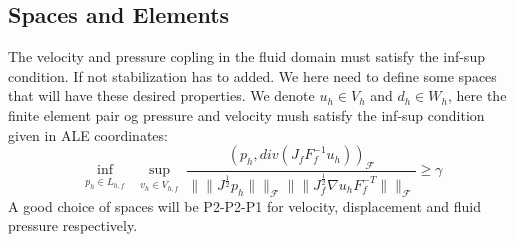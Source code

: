 \subsection*{Spaces and Elements}
The velocity and pressure copling in the fluid domain must satisfy the inf-sup condition. If not stabilization has to added. We here need to define some spaces that will have these desired properties.
We denote $u_h \in V_h$ and $ d_h \in W_h $, here the finite element pair og pressure and velocity mush satisfy the inf-sup condition given in ALE coordinates:
$$   \inf_{\substack{p_h \in L_{h,f}}}  \sup_{\substack{v_h \in V_{h,f}}} \frac{ (p_h, div(J_f F_f^{-1} u_h))_{\mathcal{F}} }{ \|\|J^{\frac{1}{2}} p_h  \|\|_{\mathcal{F}} \|\|  J^{\frac{1}{2}}_{f} \nabla u_h F_f^{-T} \|\|_{\mathcal{F}}  } \geq \gamma     $$
A good choice of spaces will be P2-P2-P1 for velocity, displacement and fluid pressure respectively. 








